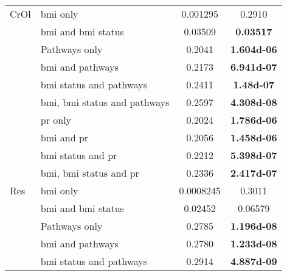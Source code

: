 \begin{ThreePartTable}
\begin{longtable}{llcc}
				\hline
				\rule{0pt}{2.25ex}CrOl    & \gls{bmi} only                           & 0.001295   & 0.2910                              \\
                                          & \gls{bmi} and \gls{bmi} status           & 0.03509    & \bfseries 0.03517                   \\
                                          & Pathways only                            & 0.2041     & \bfseries \num{1.604d-06}           \\
                                          & \gls{bmi} and pathways                   & 0.2173     & \bfseries \num{6.941d-07}           \\
                                          & \gls{bmi} status and pathways            & 0.2411     & \bfseries \num{1.48d-07}            \\
                                          & \gls{bmi}, \gls{bmi} status and pathways & 0.2597     & \bfseries \num{4.308d-08}           \\
                                          & \gls{pr} only                            & 0.2024     & \bfseries \num{1.786d-06}           \\
                                          & \gls{bmi} and \gls{pr}                   & 0.2056     & \bfseries \num{1.458d-06}           \\
                                          & \gls{bmi} status and \gls{pr}            & 0.2212     & \bfseries \num{5.398d-07}           \\
                                          & \gls{bmi}, \gls{bmi} status and \gls{pr} & 0.2336     & \bfseries \num{2.417d-07}           \\
				\hline
				\rule{0pt}{2.25ex}Res     & \gls{bmi} only                           & 0.0008245  & 0.3011                              \\
                                          & \gls{bmi} and \gls{bmi} status           & 0.02452    & 0.06579                             \\
                                          & Pathways only                            & 0.2785     & \bfseries \num{1.196d-08}           \\
                                          & \gls{bmi} and pathways                   & 0.2780     & \bfseries \num{1.233d-08}           \\
                                          & \gls{bmi} status and pathways            & 0.2914     & \bfseries \num{4.887d-09}           \\

\end{longtable}
\end{ThreePartTable}
